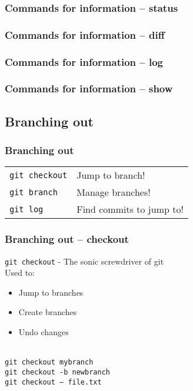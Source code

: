 \documentclass{beamer}
\begin{document}
\begin{frame}
  \frametitle{Commands for information -- status}
\end{frame}

\begin{frame}
  \frametitle{Commands for information -- diff}
\end{frame}

\begin{frame}
  \frametitle{Commands for information -- log}
\end{frame}

\begin{frame}
  \frametitle{Commands for information -- show}
\end{frame}

\subsection{Branching out}

\begin{frame}[fragile]
  \frametitle{Branching out}

  \begin{tabular}{ll}
    \texttt{git checkout} & Jump to branch! \\
    \texttt{git branch} & Manage branches! \\
    \texttt{git log} & Find commits to jump to! \\
  \end{tabular}

\end{frame}

\begin{frame}
  \frametitle{Branching out -- checkout}

    \texttt{git checkout} - The sonic screwdriver of git \\[1em]
    Used to:
    \begin{itemize}
        \item Jump to branches
        \item Create branches
        \item Undo changes
    \end{itemize} \\[1em]

    \texttt{git checkout mybranch} \\
    \texttt{git checkout -b newbranch} \\
    \texttt{git checkout -- file.txt}

\end{frame}
\end{document}
